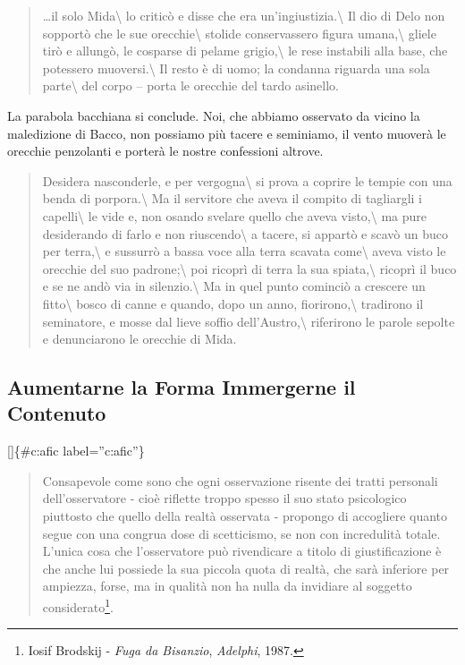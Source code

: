 \documentclass[a4paper,11pt]{article}
\begin{document}
\begin{quote}
\ldots{}il solo Mida\textbackslash{}
lo criticò e disse che era un'ingiustizia.\textbackslash{}
Il dio di Delo non sopportò che le sue orecchie\textbackslash{}
stolide conservassero figura umana,\textbackslash{}
gliele tirò e allungò, le cosparse di pelame grigio,\textbackslash{}
le rese instabili alla base, che potessero muoversi.\textbackslash{}
Il resto è di uomo; la condanna riguarda una sola parte\textbackslash{}
del corpo -- porta le orecchie del tardo asinello.
\end{quote}

La parabola bacchiana si conclude. Noi, che abbiamo osservato da vicino
la maledizione di Bacco, non possiamo più tacere e seminiamo, il vento
muoverà le orecchie penzolanti e porterà le nostre confessioni altrove.

\begin{quote}
Desidera nasconderle, e per vergogna\textbackslash{}
si prova a coprire le tempie con una benda di porpora.\textbackslash{}
Ma il servitore che aveva il compito di tagliargli i capelli\textbackslash{}
le vide e, non osando svelare quello che aveva visto,\textbackslash{}
ma pure desiderando di farlo e non riuscendo\textbackslash{}
a tacere, si appartò e scavò un buco per terra,\textbackslash{}
e sussurrò a bassa voce alla terra scavata come\textbackslash{}
aveva visto le orecchie del suo padrone;\textbackslash{}
poi ricoprì di terra la sua spiata,\textbackslash{}
ricoprì il buco e se ne andò via in silenzio.\textbackslash{}
Ma in quel punto cominciò a crescere un fitto\textbackslash{}
bosco di canne e quando, dopo un anno, fiorirono,\textbackslash{}
tradirono il seminatore, e mosse dal lieve soffio dell'Austro,\textbackslash{}
riferirono le parole sepolte e denunciarono le orecchie di Mida.
\end{quote}

\subsection{Aumentarne la Forma Immergerne il Contenuto}\hypertarget{aumentarne-la-forma-immergerne-il-contenuto}{}\label{aumentarne-la-forma-immergerne-il-contenuto}

{[}{]}\{\#c:afic label=''c:afic''\}

\begin{quote}
Consapevole come sono che ogni osservazione risente dei tratti
personali dell'osservatore - cioè riflette troppo spesso il suo stato
psicologico piuttosto che quello della realtà osservata - propongo di
accogliere quanto segue con una congrua dose di scetticismo, se non
con incredulità totale. L'unica cosa che l'osservatore può rivendicare
a titolo di giustificazione è che anche lui possiede la sua piccola
quota di realtà, che sarà inferiore per ampiezza, forse, ma in qualità
non ha nulla da invidiare al soggetto considerato\footnote{Iosif Brodskij - \emph{Fuga da Bisanzio}, \emph{Adelphi}, 1987.}.
\end{quote}
\end{document}
